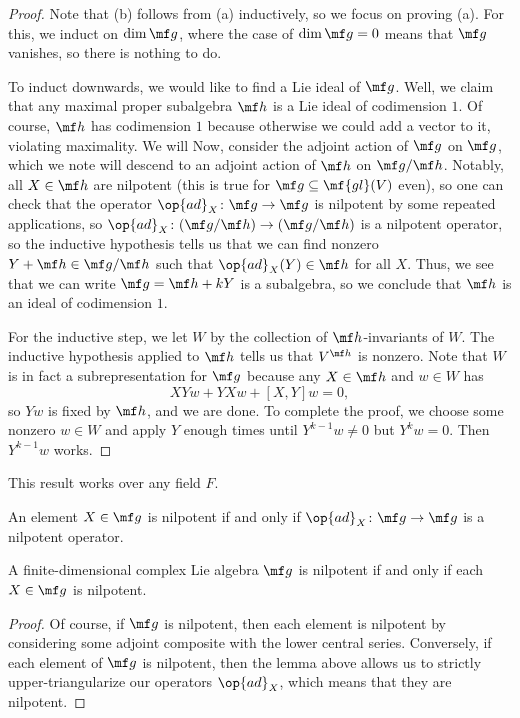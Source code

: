 \documentclass[../notes.tex]{subfiles}
\begin{document}
\begin{proof}
	Note that (b) follows from (a) inductively, so we focus on proving (a). For this, we induct on $\dim\mf g$, where the case of $\dim\mf g=0$ means that $\mf g$ vanishes, so there is nothing to do.

	To induct downwards, we would like to find a Lie ideal of $\mf g$. Well, we claim that any maximal proper subalgebra $\mf h$ is a Lie ideal of codimension $1$. Of course, $\mf h$ has codimension $1$ because otherwise we could add a vector to it, violating maximality. We will Now, consider the adjoint action of $\mf g$ on $\mf g$, which we note will descend to an adjoint action of $\mf h$ on $\mf g/\mf h$. Notably, all $X\in\mf h$ are nilpotent (this is true for $\mf g\subseteq\mf{gl}(V)$ even), so one can check that the operator $\op{ad}_X\colon\mf g\to\mf g$ is nilpotent by some repeated applications, so $\op{ad}_X\colon(\mf g/\mf h)\to(\mf g/\mf h)$ is a nilpotent operator, so the inductive hypothesis tells us that we can find nonzero $Y+\mf h\in\mf g/\mf h$ such that $\op{ad}_X(Y)\in\mf h$ for all $X$. Thus, we see that we can write $\mf g=\mf h+kY$ is a subalgebra, so we conclude that $\mf h$ is an ideal of codimension $1$.

	For the inductive step, we let $W$ by the collection of $\mf h$-invariants of $W$. The inductive hypothesis applied to $\mf h$ tells us that $V^{\mf h}$ is nonzero. Note that $W$ is in fact a subrepresentation for $\mf g$ because any $X\in\mf h$ and $w\in W$ has
	\[XYw+YXw+[X,Y]w=0,\]
	so $Yw$ is fixed by $\mf h$, and we are done. To complete the proof, we choose some nonzero $w\in W$ and apply $Y$ enough times until $Y^{k-1}w\ne0$ but $Y^kw=0$. Then $Y^{k-1}w$ works.
\end{proof}
\begin{remark}
	This result works over any field $F$.
\end{remark}
\begin{definition}
	An element $X\in\mf g$ is nilpotent if and only if $\op{ad}_X\colon\mf g\to\mf g$ is a nilpotent operator.
\end{definition}
\begin{corollary}
	A finite-dimensional complex Lie algebra $\mf g$ is nilpotent if and only if each $X\in\mf g$ is nilpotent.
\end{corollary}
\begin{proof}
	Of course, if $\mf g$ is nilpotent, then each element is nilpotent by considering some adjoint composite with the lower central series. Conversely, if each element of $\mf g$ is nilpotent, then the lemma above allows us to strictly upper-triangularize our operators $\op{ad}_X$, which means that they are nilpotent.
\end{proof}
\end{document}
